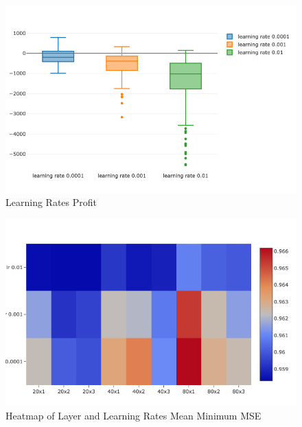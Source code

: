 \documentclass[a4paper,latin]{paper}
\begin{document}
\begin{figure}[H]
	\centering \includegraphics[scale=0.5]{images/synthetic_results/bp_lr_profit.png}
	\caption{Learning Rates Profit}
	\label{figure-synthetic-lr-profit}
\end{figure}

\begin{figure}[H]
	\centering \includegraphics[scale=0.5]{images/synthetic_results/layers_lr_heatmap_mean_min_mse.png}
	\caption{Heatmap of Layer and Learning Rates Mean Minimum MSE}
	\label{figure-synthetic-layer-lr-mse}
\end{figure}
\end{document}
